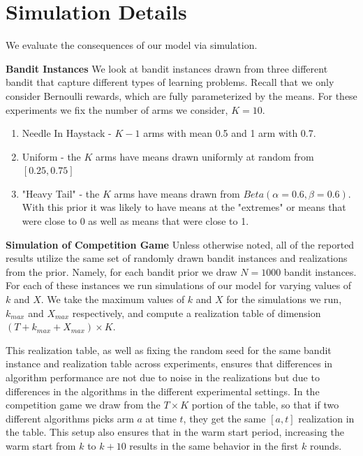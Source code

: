 \documentclass[letterpaper]{article}
\theoremstyle{definition}
\begin{document}
\section{Simulation Details}\label{section:3}

We evaluate the consequences of our model via simulation.

\textbf{Bandit Instances} We look at bandit instances drawn from three different bandit  that capture different types of learning problems. Recall that we only consider Bernoulli rewards, which are fully parameterized by the means. For these experiments we fix the number of arms we consider, $K = 10$.
\begin{enumerate}
\item Needle In Haystack - $K-1$ arms with mean 0.5 and 1 arm with 0.7.
\item Uniform - the $K$ arms have means drawn uniformly at random from $[0.25, 0.75]$
\item "Heavy Tail" - the $K$ arms have means drawn from $Beta(\alpha=0.6, \beta = 0.6)$. With this prior it was likely to have means at the "extremes" or means that were close to 0 as well as means that were close to 1.
\end{enumerate}

\noindent \textbf{Simulation of Competition Game} Unless otherwise noted, all of the reported results utilize the same set of randomly drawn bandit instances and realizations from the prior. Namely, for each bandit prior we draw $N = 1000$ bandit instances. For each of these instances we run simulations of our model for varying values of $k$ and $X$. We take the maximum values of $k$ and $X$ for the simulations we run, $k_{max}$ and $X_{max}$ respectively, and compute a realization table of dimension $(T+k_{max}+X_{max}) \times K$.

This realization table, as well as fixing the random seed for the same bandit instance and realization table across experiments, ensures that differences in algorithm performance are not due to noise in the realizations but due to differences in the algorithms in the different experimental settings. In the competition game we draw from the $T \times K$ portion of the table, so that if two different algorithms picks arm $a$ at time $t$, they get the same $[a, t]$ realization in the table. This setup also ensures that in the warm start period, increasing the warm start from $k$ to $k + 10$ results in the same behavior in the first $k$ rounds.
\end{document}
